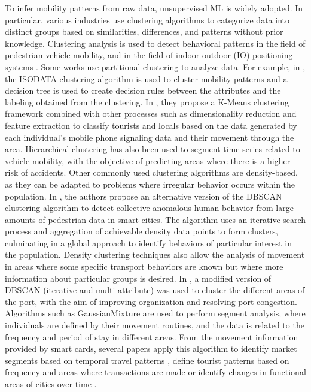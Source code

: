 To infer mobility patterns from raw data, unsupervised ML is widely adopted. In particular, various industries use clustering algorithms to categorize data into distinct groups based on similarities, differences, and patterns without prior knowledge. Clustering analysis is used to detect behavioral patterns in the field of pedestrian-vehicle mobility, and in the field of indoor-outdoor (IO) positioning systems \cite{mallik2023paving}. Some works use partitional clustering to analyze data. For example, in \cite{yao2021understanding}, the ISODATA clustering algorithm is used to cluster mobility patterns and a decision tree is used to create decision rules between the attributes and the labeling obtained from the clustering. In \cite{sun2021identifying}, they propose a K-Means clustering framework combined with other processes such as dimensionality reduction and feature extraction to classify tourists and locals based on the data generated by each individual's mobile phone signaling data and their movement through the area. Hierarchical clustering \cite{pasupathi2021trend} has also been used to segment time series related to vehicle mobility, with the objective of predicting areas where there is a higher risk of accidents. Other commonly used clustering algorithms are density-based, as they can be adapted to problems where irregular behavior occurs within the population. In \cite{belhadi2021deep}, the authors propose an alternative version of the DBSCAN clustering algorithm to detect collective anomalous human behavior from large amounts of pedestrian data in smart cities. The algorithm uses an iterative search process and aggregation of achievable density data points to form clusters, culminating in a global approach to identify behaviors of particular interest in the population. Density clustering techniques also allow the analysis of movement in areas where some specific transport behaviors are known but where more information about particular groups is desired. In \cite{bai4086627data}, a modified version of DBSCAN (iterative and multi-attribute) was used to cluster the different areas of the port, with the aim of improving organization and resolving port congestion. Algorithms such as GaussianMixture are used to perform segment analysis, where individuals are defined by their movement routines, and the data is related to the frequency and period of stay in different areas. From the movement information provided by smart cards, several papers apply this algorithm to identify market segments based on temporal travel patterns \cite{cats2022unravelling}, define tourist patterns based on frequency and areas where transactions are made \cite{gutierrez2020profiling} or identify changes in functional areas of cities over time \cite{wang2021identifying}.

